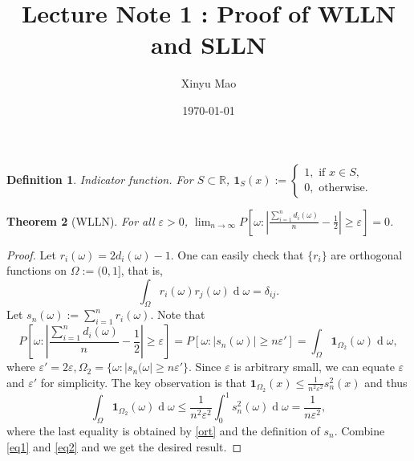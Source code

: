 \documentclass[12pt]{article}
\title{Lecture Note 1 : Proof of WLLN and SLLN}
\author{Xinyu Mao}
\date{\today}
\newtheorem{theorem}{Theorem}
\newtheorem{definition}[theorem]{Definition}
\newcommand\Real{\mathbb{R}}
\newcommand\one{\bm{1}}
\newcommand\eps{\varepsilon}
\DeclareMathOperator{\diff}{d}
\begin{document}
\maketitle

\begin{definition}{Indicator function.}
For $S \subset \Real$,  $\one_S(x) := \begin{cases}
    1, \text{ if $x \in S$}, \\
    0, \text{ otherwise.}
\end{cases}    
$
\end{definition}

\begin{theorem}[WLLN]\label{wlln}
    For all $\eps > 0$, $\lim_{n \to \infty} P[\omega : |\frac{\sum_{i=1}^n d_i(\omega)}{n} - \frac{1}{2}| \geq \eps] = 0$.
\end{theorem}
\begin{proof}
    Let $r_i(\omega) = 2d_i(\omega) - 1$. 
    One can easily check that $\{r_i\}$ are orthogonal functions
    on $\Omega := (0,1]$, that is,
    \begin{equation} \label{ort}
        \int_{\Omega} r_i(\omega)r_j(\omega) \diff \omega = \delta_{ij}.
    \end{equation}
    Let $s_n(\omega) := \sum_{i=1}^n r_i(\omega)$.
    Note that 
    \begin{equation} \label{eq1}
        P[\omega : |\frac{\sum_{i=1}^n d_i(\omega)}{n} - \frac{1}{2}| \geq \eps]
        = P[\omega : |s_n(\omega)| \ge n\eps']  
        = \int_{\Omega} \one_{\Omega_2}(\omega) \diff \omega,
    \end{equation}
    where $\eps' = 2\eps, \Omega_2 = \{\omega : |s_n(\omega| \geq n\eps'\}$.
    Since $\eps$ is arbitrary small,  we can equate $\eps$ and $\eps'$ for simplicity.
    The key observation is that $\one_{\Omega_2}(x) \leq \frac{1}{n^2\eps^2}s_n^2(x)$ and thus
    \begin{equation} \label{eq2}
        \int_{\Omega} \one_{\Omega_2}(\omega) \diff \omega
        \leq \frac{1}{n^2\eps^2} \int_0^1 s_n^2(\omega) \diff \omega
        = \frac{1}{n\eps^2},
    \end{equation}
    where the last equality is obtained by \cref{ort} and the definition of $s_n$.
    Combine \cref{eq1} and \cref{eq2}
    and we get the desired result.
\end{proof}
\end{document}
